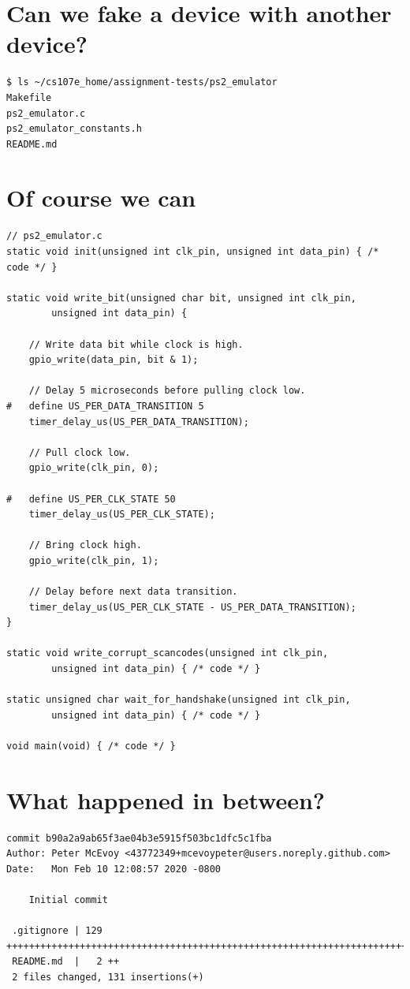 \documentclass{article}
\begin{document}
\newpage

\section*{Can we fake a device with another device?}
\vspace{2ex}
\begin{verbatim}
$ ls ~/cs107e_home/assignment-tests/ps2_emulator
Makefile
ps2_emulator.c
ps2_emulator_constants.h
README.md
\end{verbatim}

\newpage

\section*{Of course we can}
\vspace{2ex}
\begin{verbatim}
// ps2_emulator.c
static void init(unsigned int clk_pin, unsigned int data_pin) { /* code */ }

static void write_bit(unsigned char bit, unsigned int clk_pin,
        unsigned int data_pin) {

    // Write data bit while clock is high.
    gpio_write(data_pin, bit & 1);

    // Delay 5 microseconds before pulling clock low.
#   define US_PER_DATA_TRANSITION 5
    timer_delay_us(US_PER_DATA_TRANSITION);

    // Pull clock low.
    gpio_write(clk_pin, 0);

#   define US_PER_CLK_STATE 50
    timer_delay_us(US_PER_CLK_STATE);

    // Bring clock high.
    gpio_write(clk_pin, 1);

    // Delay before next data transition.
    timer_delay_us(US_PER_CLK_STATE - US_PER_DATA_TRANSITION);
}

static void write_corrupt_scancodes(unsigned int clk_pin,
        unsigned int data_pin) { /* code */ }

static unsigned char wait_for_handshake(unsigned int clk_pin,
        unsigned int data_pin) { /* code */ }

void main(void) { /* code */ }
\end{verbatim}

\newpage

\section*{What happened in between?}
\vspace{2ex}
\begin{verbatim}
commit b90a2a9ab65f3ae04b3e5915f503bc1dfc5c1fba
Author: Peter McEvoy <43772349+mcevoypeter@users.noreply.github.com>
Date:   Mon Feb 10 12:08:57 2020 -0800

    Initial commit

 .gitignore | 129 +++++++++++++++++++++++++++++++++++++++++++++++++++++++++++++++++++++++++++++++++++++++
 README.md  |   2 ++
 2 files changed, 131 insertions(+)
\end{verbatim}
\end{document}
